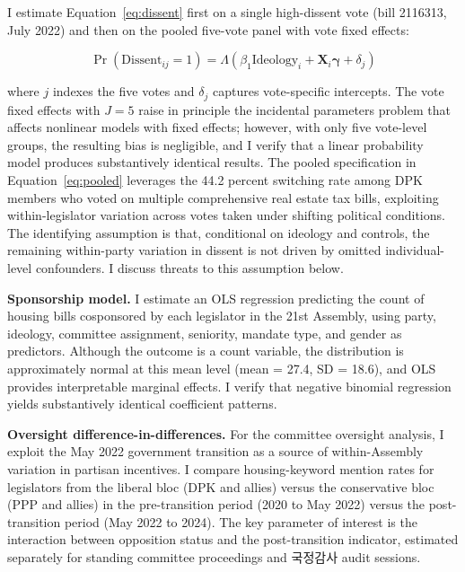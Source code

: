 \documentclass[11pt]{article}
\begin{document}
I estimate Equation~\ref{eq:dissent} first on a single high-dissent vote (bill 2116313, July 2022) and then on the pooled five-vote panel with vote fixed effects:

\begin{equation}
\Pr(\text{Dissent}_{ij} = 1) = \Lambda\!\left(\beta_1 \text{Ideology}_{i} + \mathbf{X}_{i} \boldsymbol{\gamma} + \delta_j\right)
\label{eq:pooled}
\end{equation}

\noindent where $j$ indexes the five votes and $\delta_j$ captures vote-specific intercepts. The vote fixed effects with $J = 5$ raise in principle the incidental parameters problem that affects nonlinear models with fixed effects; however, with only five vote-level groups, the resulting bias is negligible, and I verify that a linear probability model produces substantively identical results. The pooled specification in Equation~\ref{eq:pooled} leverages the 44.2 percent switching rate among DPK members who voted on multiple comprehensive real estate tax bills, exploiting within-legislator variation across votes taken under shifting political conditions. The identifying assumption is that, conditional on ideology and controls, the remaining within-party variation in dissent is not driven by omitted individual-level confounders. I discuss threats to this assumption below.

\textbf{Sponsorship model.} I estimate an OLS regression predicting the count of housing bills cosponsored by each legislator in the 21st Assembly, using party, ideology, committee assignment, seniority, mandate type, and gender as predictors. Although the outcome is a count variable, the distribution is approximately normal at this mean level (mean = 27.4, SD = 18.6), and OLS provides interpretable marginal effects. I verify that negative binomial regression yields substantively identical coefficient patterns.

\textbf{Oversight difference-in-differences.} For the committee oversight analysis, I exploit the May 2022 government transition as a source of within-Assembly variation in partisan incentives. I compare housing-keyword mention rates for legislators from the liberal bloc (DPK and allies) versus the conservative bloc (PPP and allies) in the pre-transition period (2020 to May 2022) versus the post-transition period (May 2022 to 2024). The key parameter of interest is the interaction between opposition status and the post-transition indicator, estimated separately for standing committee proceedings and 국정감사 audit sessions.
\end{document}
